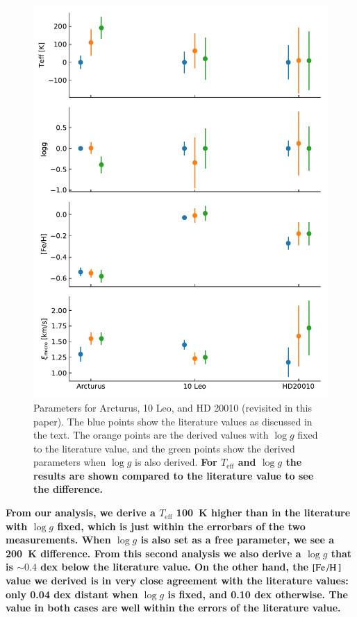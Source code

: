 \documentclass{aa}
\begin{document}
\begin{figure}[htpb!]
    \centering
    \includegraphics[width=1.0\linewidth]{figures/parameters.pdf}
    \caption{Parameters for Arcturus, 10 Leo, and HD 20010 (revisited in this paper). The blue
             points show the literature values as discussed in the text. The orange points are the
             derived values with $\log g$ fixed to the literature value, and the green points show
             the derived parameters when $\log g$ is also derived. {\bf For $T_\mathrm{eff}$ and
             $\log g$ the results are shown compared to the literature value to see the difference.}}
    \label{fig:parameters}
\end{figure}

{\bf From our analysis, we derive a $T_\mathrm{eff}$ \SI{100}{K} higher than in the literature with
$\log g$ fixed, which is just within the errorbars of the two measurements. When $\log g$ is also
set as a free parameter, we see a \SI{200}{K} difference.  From this second analysis we also derive
a $\log g$ that is $\sim 0.4$ dex below the literature value. On the other hand, the
$[\ion{Fe}/\ion{H}]$ value we derived is in very close agreement with the literature values: only
0.04 dex distant when $\log g$ is fixed, and 0.10 dex otherwise. The value in both cases are well
within the errors of the literature value.}
\end{document}
